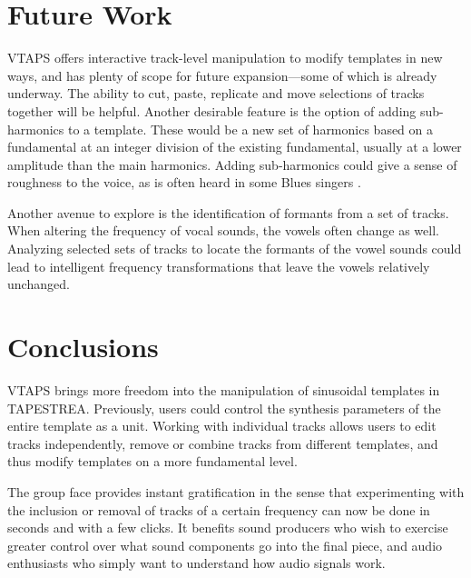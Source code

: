 \documentclass{article}
\newcommand{\noun}[1]{\textsc{#1}}
\begin{document}
\section{\label{sec:Future-Work}Future Work}

VTAPS offers interactive track-level manipulation to modify templates in 
new ways, and has plenty of scope for future expansion---some of which is 
already underway. The ability to cut, paste, 
replicate and move selections of tracks together will be helpful. 
Another desirable feature is the option of adding sub-harm\-onics to a template. 
These would be a new set of harmonics based on a fundamental at an integer 
division of the existing fundamental, usually at a lower amplitude than the main 
harmonics. Adding sub-harmonics could give a sense of roughness to the voice, 
as is often heard in some Blues singers \cite{growl}. 

Another avenue to explore is the identification of formants from a set of tracks. 
When altering the frequency of vocal sounds, the vowels often change as well. 
Analyzing selected sets of tracks to locate the formants of the vowel sounds could lead 
to intelligent frequency transformations that leave the vowels relatively unchanged. 

\section{Conclusions}

VTAPS brings more freedom into the manipulation of sinusoidal templates in TAPESTREA.
Previously, users could control the synthesis parameters of the entire template as a unit. 
Working with individual tracks allows users to edit tracks independently, remove or combine 
tracks from different templates, and thus modify templates on a more fundamental level.


The group face provides instant gratification in the sense that experimenting
with the inclusion or removal of tracks of a certain frequency can now be done
in seconds and with a few clicks. It benefits sound producers who wish to
exercise greater control over what sound components go into the final piece, and
audio enthusiasts who simply want to understand how audio signals work. 
\end{document}
